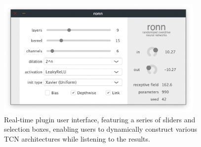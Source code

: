 \documentclass{article}
\begin{document}
\begin{figure}[h] 
  \centering
  \includegraphics[width=0.9\textwidth]{ronn-vst-ui.png}  
  \caption{Real-time plugin user interface, featuring a series of sliders and selection boxes, 
  enabling users to dynamically construct various TCN architectures while listening to the results.
  }
  \label{fig:ui}
\end{figure}

%    
\end{document}
